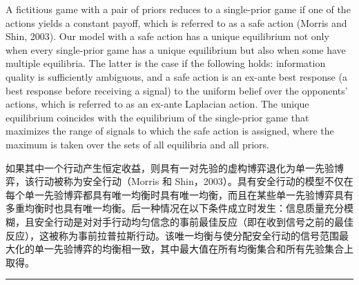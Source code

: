 \documentclass[12pt,a4paper]{article}
\newenvironment{original}
  {\par\medskip\noindent\color{black}\ignorespaces}
  {\par\medskip}
\newenvironment{translation}
  {\par\noindent\color{darkblue}\ignorespaces}
  {\par\medskip\noindent\hrule\par\medskip}
\theoremstyle{definition}
\theoremstyle{remark}
\begin{document}
\begin{original}
A fictitious game with a pair of priors reduces to a single-prior game if one of the actions yields a constant payoff, which is referred to as a safe action (Morris and Shin, 2003). Our model with a safe action has a unique equilibrium not only when every single-prior game has a unique equilibrium but also when some have multiple equilibria. The latter is the case if the following holds: information quality is sufficiently ambiguous, and a safe action is an ex-ante best response (a best response before receiving a signal) to the uniform belief over the opponents' actions, which is referred to as an ex-ante Laplacian action. The unique equilibrium coincides with the equilibrium of the single-prior game that maximizes the range of signals to which the safe action is assigned, where the maximum is taken over the sets of all equilibria and all priors.
\end{original}
\begin{translation}
如果其中一个行动产生恒定收益，则具有一对先验的虚构博弈退化为单一先验博弈，该行动被称为安全行动（Morris 和 Shin，2003）。具有安全行动的模型不仅在每个单一先验博弈都具有唯一均衡时具有唯一均衡，而且在某些单一先验博弈具有多重均衡时也具有唯一均衡。后一种情况在以下条件成立时发生：信息质量充分模糊，且安全行动是对对手行动均匀信念的事前最佳反应（即在收到信号之前的最佳反应），这被称为事前拉普拉斯行动。该唯一均衡与使分配安全行动的信号范围最大化的单一先验博弈的均衡相一致，其中最大值在所有均衡集合和所有先验集合上取得。
\end{translation}
\end{document}
